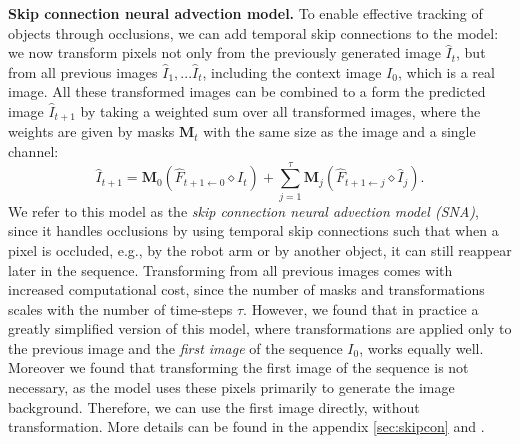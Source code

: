 \noindent \textbf{Skip connection neural advection model.}
To enable effective tracking of objects through occlusions, we can add temporal skip connections to the model: we now transform pixels not only from the previously generated image $\hat{I}_t$, but from all previous images $\hat{I}_1,...\hat{I}_{t}$, including the context image $I_0$, which is a real image. All these transformed images can be combined to a form the predicted image $\hat{I}_{t+1}$ by taking a weighted sum over all transformed images, where the weights are given by masks $\mathbf{M}_t$ with the same size as the image and a single channel:
\begin{equation}
\hat{I}_{t+1} =  \mathbf{M}_{0} (\hat{F}_{t+1 \leftarrow 0} \diamond I_t) +  \sum_{j=1}^{\tau} \mathbf{M}_{j} (\hat{F}_{t+1 \leftarrow j} \diamond  \hat{I}_j).
\end{equation}
We refer to this model as the \emph{skip connection neural advection model (SNA)}, since it handles occlusions by using temporal skip connections such that when a pixel is occluded, e.g., by the robot arm or by another object, it can still reappear later in the sequence.
Transforming from all previous images comes with increased computational cost, since the number of masks and transformations scales with the number of time-steps $\tau$. However, we found that in practice a greatly simplified version of this model, where transformations are applied only to the previous image and the \emph{first image} of the sequence $I_0$, works equally well. Moreover we found that transforming the first image of the sequence is not necessary, as the model uses these pixels primarily to generate the image background. Therefore, we can use the first image directly, without transformation. More details can be found in the appendix \ref{sec:skipcon} and \cite{sna}.